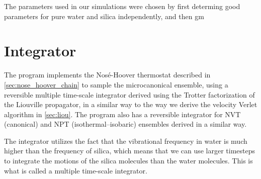 The parameters used in our simulations were chosen by first determing good parameters for pure water and silica independently, and then gm


\section{Integrator}

The program implements the Nos\'e-Hoover thermostat described in \cref{sec:nose_hoover_chain} to sample the microcanonical ensemble, using a reversible multiple time-scale integrator derived using the Trotter factorization of the Liouville propagator\cite{tuckerman1992reversible}, in a similar way to the way we derive the velocity Verlet algorithm in \cref{sec:liou}. The program also has a reversible integrator for NVT (canonical) and NPT (isothermal–isobaric) ensembles\cite{martyna1996explicit} derived in a similar way.

The integrator utilizes the fact that the vibrational frequency in water is much higher than the frequency of silica, which means that we can use larger timesteps to integrate the motions of the silica molecules than the water molecules. This is what is called a multiple time-scale integrator.
